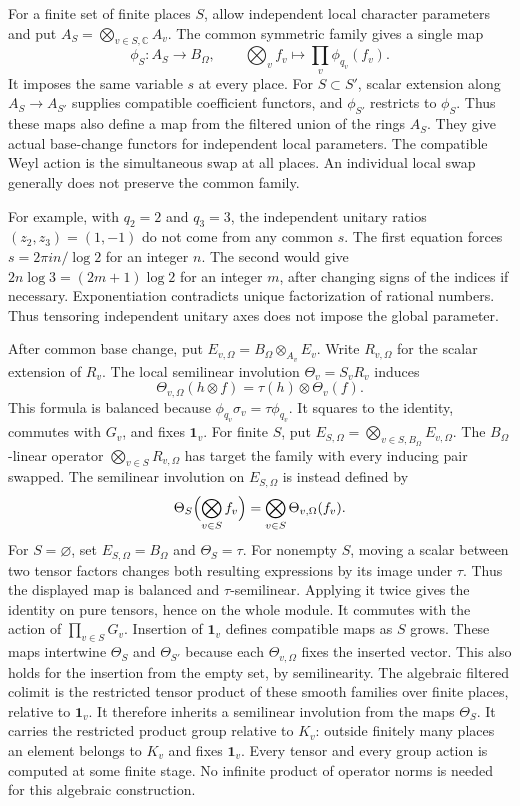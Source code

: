 For a finite set of finite places $S$, allow independent local character
parameters and put $A_S=\bigotimes_{v\in S,\mathbb C}A_v$.
The common symmetric family gives a single map
\[
 \phi_S:A_S\longrightarrow B_\Omega,\qquad
 \bigotimes_v f_v\longmapsto\prod_v\phi_{q_v}(f_v).
\]
It imposes the same variable $s$ at every place.
For $S\subset S'$, scalar extension along $A_S\to A_{S'}$ supplies
compatible coefficient functors, and $\phi_{S'}$ restricts to $\phi_S$.
Thus these maps also define a map from the filtered union of the rings $A_S$.
They give actual base-change functors for independent local parameters.
The compatible Weyl action is the simultaneous swap at all places.
An individual local swap generally does not preserve the common family.

For example, with $q_2=2$ and $q_3=3$, the independent unitary ratios
$(z_2,z_3)=(1,-1)$ do not come from any common $s$.
The first equation forces $s=2\pi i n/\log2$ for an integer $n$.
The second would give $2n\log3=(2m+1)\log2$ for an integer $m$,
after changing signs of the indices if necessary.
Exponentiation contradicts unique factorization of rational numbers.
Thus tensoring independent unitary axes does not impose the global parameter.

After common base change, put $E_{v,\Omega}=B_\Omega\otimes_{A_v}E_v$.
Write $R_{v,\Omega}$ for the scalar extension of $R_v$.
The local semilinear involution $\Theta_v=S_vR_v$ induces
\[
 \Theta_{v,\Omega}(h\otimes f)=\tau(h)\otimes\Theta_v(f).
\]
This formula is balanced because $\phi_{q_v}\sigma_v=\tau\phi_{q_v}$.
It squares to the identity, commutes with $G_v$, and fixes $\mathbf1_v$.
For finite $S$, put $E_{S,\Omega}=\bigotimes_{v\in S,B_\Omega}E_{v,\Omega}$.
The $B_\Omega$-linear operator $\bigotimes_{v\in S}R_{v,\Omega}$
has target the family with every inducing pair swapped.
The semilinear involution on $E_{S,\Omega}$ is instead defined by
\[
 \Theta_S\Bigl(\bigotimes_{v\in S}f_v\Bigr)
     =\bigotimes_{v\in S}\Theta_{v,\Omega}(f_v).
\]
For $S=\varnothing$, set $E_{S,\Omega}=B_\Omega$ and $\Theta_S=\tau$.
For nonempty $S$, moving a scalar between two tensor factors changes
both resulting expressions by its image under $\tau$.
Thus the displayed map is balanced and $\tau$-semilinear.
Applying it twice gives the identity on pure tensors, hence on the whole module.
It commutes with the action of $\prod_{v\in S}G_v$.
Insertion of $\mathbf1_v$ defines compatible maps as $S$ grows.
These maps intertwine $\Theta_S$ and $\Theta_{S'}$ because each
$\Theta_{v,\Omega}$ fixes the inserted vector.
This also holds for the insertion from the empty set, by semilinearity.
The algebraic filtered colimit is the restricted tensor product of these
smooth families over finite places, relative to $\mathbf1_v$.
It therefore inherits a semilinear involution from the maps $\Theta_S$.
It carries the restricted product group relative to $K_v$:
outside finitely many places an element belongs to $K_v$ and fixes $\mathbf1_v$.
Every tensor and every group action is computed at some finite stage.
No infinite product of operator norms is needed for this algebraic construction.

